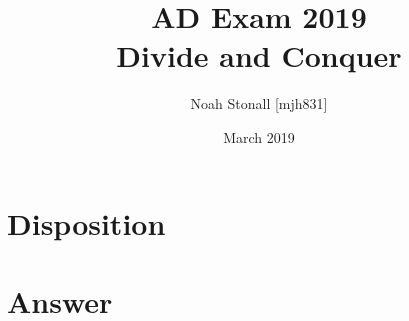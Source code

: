 \documentclass{article}
\title{AD Exam 2019 \\ Divide and Conquer}
\author{Noah Stonall [mjh831]}
\date{March 2019}
\begin{document}
\maketitle

\section*{Disposition}

\newpage
\section*{Answer}

\end{document}
